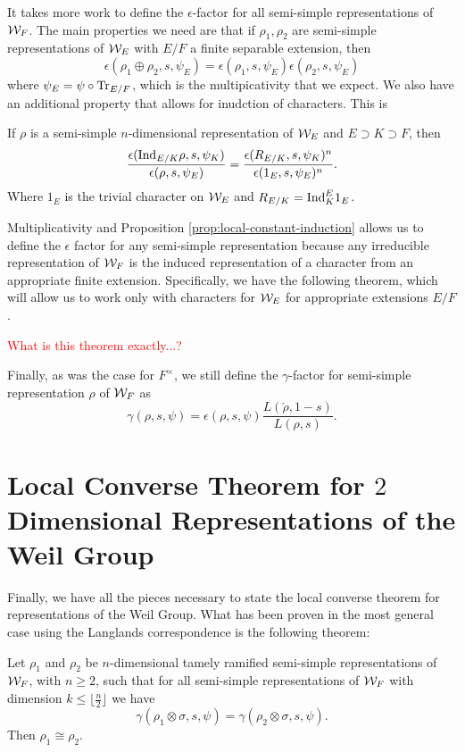 It takes more work to define the $\epsilon$-factor for all semi-simple representations of $\mathcal{W}_F$.
The main properties we need are that if $\rho_1, \rho_2$ are semi-simple representations of $\mathcal{W}_E$ with $E/F$ a finite separable extension, then
\[\epsilon(\rho_1 \oplus \rho_2,s,\psi_E) = \epsilon(\rho_1,s,\psi_E)\epsilon(\rho_2,s,\psi_E)\]
where $\psi_E = \psi \circ \textrm{Tr}_{E/F}$, which is the multipicativity that we expect.
We also have an additional property that allows for inudction of characters.
This is
\label{prop:local-constant-induction}
\begin{prop}
  If $\rho$ is a semi-simple $n$-dimensional representation of $\mathcal{W}_E$ and $E\supset K \supset F$, then
  \[\frac{\epsilon(\textrm{Ind}_{E/K} \rho, s, \psi_K)}{\epsilon(\rho,s,\psi_E)} = \frac{\epsilon(R_{E/K},s,\psi_K)^n}{\epsilon(1_E,s,\psi_E)^n}.\]
  Where $1_E$ is the trivial character on $\mathcal{W}_E$ and $R_{E/K} = \textrm{Ind}^E_K 1_E$.
\end{prop}
Multiplicativity and Proposition \ref{prop:local-constant-induction} allows us to define the $\epsilon$ factor for any semi-simple representation because any irreducible representation of $\mathcal{W}_F$ is the induced representation of a character from an appropriate finite extension.
Specifically, we have the following theorem, which will allow us to work only with characters for $\mathcal{W}_E$ for appropriate extensions $E/F$.
\begin{theorem}
\textcolor{red}{What is this theorem exactly...?}
\end{theorem}

Finally, as was the case for $F^\times$, we still define the $\gamma$-factor for semi-simple representation $\rho$ of $\mathcal{W}_F$ as
\[\gamma(\rho, s ,\psi) = \epsilon(\rho, s, \psi) \frac{L(\check{\rho},1-s)}{L(\rho,s)}.\]

\section{Local Converse Theorem for $2$ Dimensional Representations of the Weil Group}
\label{sec:n=2-LCT-weil-group}
Finally, we have all the pieces necessary to state the local converse theorem for representations of the Weil Group.
What has been proven in the most general case using the Langlands correspondence is the following theorem:

\begin{theorem}
  Let $\rho_1$ and $\rho_2$ be $n$-dimensional tamely ramified semi-simple representations of $\mathcal{W}_F$, with $n \geq 2$, such that for all semi-simple representations of $\mathcal{W}_F$ with dimension $k \leq \lfloor \frac{n}{2} \rfloor$ we have
  \[\gamma(\rho_1 \otimes \sigma,s,\psi) = \gamma(\rho_2 \otimes \sigma,s,\psi).\]
  Then $\rho_1 \cong \rho_2$.
\end{theorem}

